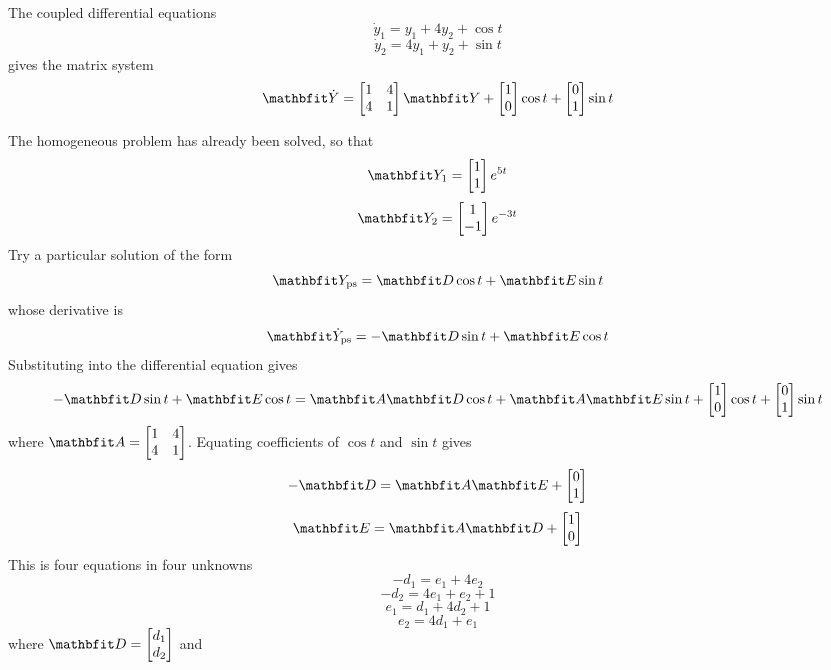 \begin{example}
The coupled differential equations
$$\dot{y}_1=y_1+4y_2+\cos t$$
$$\dot{y}_2=4y_1+y_2+\sin t$$
gives the matrix system
$$\vect{\dot{Y}}=\begin{bmatrix}1&4\\4&1\end{bmatrix}\vect{Y}+
\begin{bmatrix}1\\0\end{bmatrix}\cos t+
\begin{bmatrix}0\\1\end{bmatrix}\sin t$$

The homogeneous problem has already been solved, so that
$$\vect{Y}_1=\begin{bmatrix}1\\1\end{bmatrix}e^{5t}$$
$$\vect{Y}_2=\begin{bmatrix}1\\-1\end{bmatrix}e^{-3t}$$
Try a particular solution of the form
$$\vect{Y}_{\rm ps}=\vect{D}\cos t+\vect{E}\sin t$$
whose derivative is
$$\vect{\dot{Y}}_{\rm ps}=-\vect{D}\sin t+\vect{E}\cos t$$
Substituting into the differential equation gives
$$-\vect{D}\sin t+\vect{E}\cos t=\vect{A}\vect{D}\cos t
+\vect{A}\vect{E}\sin t+
\begin{bmatrix}1\\0\end{bmatrix}\cos t+
\begin{bmatrix}0\\1\end{bmatrix}\sin t$$
where $\vect{A}=\begin{bmatrix}1&4\\4&1\end{bmatrix}$.  Equating
coefficients of $\cos t$ and $\sin t$ gives
$$-\vect{D}=\vect{A}\vect{E}+\begin{bmatrix}0\\1\end{bmatrix}$$
$$\vect{E}=\vect{A}\vect{D}+\begin{bmatrix}1\\0\end{bmatrix}$$
This is four equations in four unknowns
$$-d_1=e_1+4e_2$$
$$-d_2=4e_1+e_2+1$$
$$e_1=d_1+4d_2+1$$
$$e_2=4d_1+e_1$$
where $\vect{D}=\begin{bmatrix}d_1\\d_2\end{bmatrix}$ and

\end{example}
